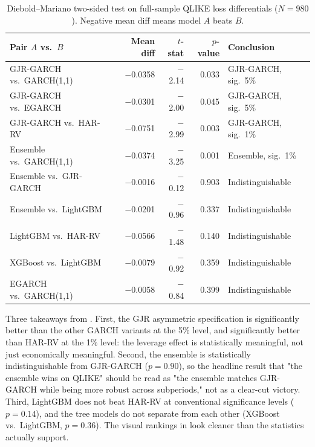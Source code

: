 \begin{table}[H]
\centering
\small
\setlength{\tabcolsep}{5pt}
\caption{Diebold--Mariano two-sided test on full-sample QLIKE loss differentials ($N=980$). Negative mean diff means model $A$ beats $B$.}
\label{tab:dm}
\begin{tabular}{l r r r l}
\toprule
\textbf{Pair $A$ vs.\ $B$} & \textbf{Mean diff} & \textbf{$t$-stat} & \textbf{$p$-value} & \textbf{Conclusion} \\
\midrule
GJR-GARCH vs.\ GARCH(1,1)  & $-$0.0358 & $-$2.14 & 0.033 & GJR-GARCH, sig.\ 5\% \\
GJR-GARCH vs.\ EGARCH      & $-$0.0301 & $-$2.00 & 0.045 & GJR-GARCH, sig.\ 5\% \\
GJR-GARCH vs.\ HAR-RV      & $-$0.0751 & $-$2.99 & 0.003 & GJR-GARCH, sig.\ 1\% \\
Ensemble vs.\ GARCH(1,1)   & $-$0.0374 & $-$3.25 & 0.001 & Ensemble, sig.\ 1\% \\
Ensemble vs.\ GJR-GARCH    & $-$0.0016 & $-$0.12 & 0.903 & Indistinguishable \\
Ensemble vs.\ LightGBM     & $-$0.0201 & $-$0.96 & 0.337 & Indistinguishable \\
LightGBM vs.\ HAR-RV       & $-$0.0566 & $-$1.48 & 0.140 & Indistinguishable \\
XGBoost vs.\ LightGBM      & $-$0.0079 & $-$0.92 & 0.359 & Indistinguishable \\
EGARCH vs.\ GARCH(1,1)     & $-$0.0058 & $-$0.84 & 0.399 & Indistinguishable \\
\bottomrule
\end{tabular}
\end{table}

Three takeaways from . First, the GJR asymmetric specification is significantly better than the other GARCH variants at the 5\% level, and significantly better than HAR-RV at the 1\% level: the leverage effect is statistically meaningful, not just economically meaningful. Second, the ensemble is statistically indistinguishable from GJR-GARCH ($p = 0.90$), so the headline result that "the ensemble wins on QLIKE" should be read as "the ensemble matches GJR-GARCH while being more robust across subperiods," not as a clear-cut victory. Third, LightGBM does not beat HAR-RV at conventional significance levels ($p = 0.14$), and the tree models do not separate from each other (XGBoost vs.\ LightGBM, $p = 0.36$). The visual rankings in  look cleaner than the statistics actually support.

